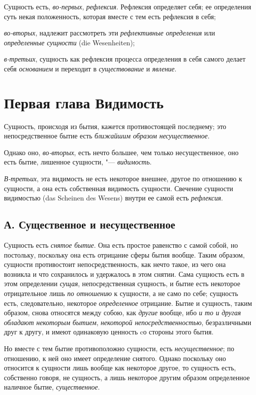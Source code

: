 Сущность есть, {\em во-первых}, {\em рефлексия}. Рефлексия определяет себя;
ее определения суть некая положенность, которая вместе с тем есть
рефлексия в себя;

{\em во-вторых}, надлежит рассмотреть эти {\em рефлективные определения} или
{\em определенные сущности} (die Wesenheiten);

{\em в-третьих}, сущность как рефлексия процесса
определения в себя самого делает себя {\em основанием}
и переходит в {\em существование} и {\em явление}.

\chapter[{\em Первая глава} Видимость]{Первая глава Видимость}
Сущность, происходя из бытия, кажется
противостоящей последнему; это непосредственное бытие есть
{\em ближайшим образом несущественное}.

Однако оно, {\em во-вторых}, есть нечто большее, чем только
несущественное, оно есть бытие, лишенное сущности, "--- {\em видимость}.

{\em В-третьих}, эта видимость не есть некоторое
внешнее, другое по отношению к сущности, а она есть собственная видимость
сущности. Свечение сущности видимостью (das Scheinen des Wesens) внутри ее
самой есть {\em рефлексия}.

\section[А. Существенное и несущественное]{А. Существенное и несущественное}
Сущность есть {\em снятое
бытие}. Она есть простое равенство с самой собой, но постольку, поскольку
она есть отрицание сферы бытия вообще. Таким образом, сущности противостоит
непосредственность, как нечто такое, из чего она возникла и что сохранилось
и удержалось в этом снятии. Сама сущность есть в этом определении
{\em сущая}, непосредственная сущность, и бытие есть
некоторое отрицательное лишь {\em по отношению} к
сущности, а не само по себе; сущность есть, следовательно, некоторое
{\em определенное} отрицание. Бытие и сущность, таким
образом, снова относятся между собою, как {\em другие}
вообще, ибо {\em и то и другая обладают некоторым
бытием}, {\em некоторой непосредственностью}, безразличными друг к другу,
и имеют одинаковую ценность cо стороны этого бытия.

Но вместе с тем бытие противоположно сущности, есть
{\em несущественное}; по отношению, к ней оно имеет
определение снятого. Однако поскольку оно относится к сущности лишь вообще
как некоторое другое, то сущность есть, собственно говоря, не сущность, а
лишь некоторое другим образом определенное наличное бытие,
{\em существенное}.

